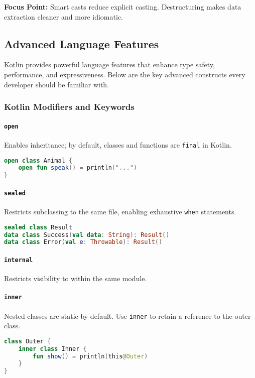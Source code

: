 \documentclass[a4paper,12pt]{article}
\begin{document}
\textbf{Focus Point:} Smart casts reduce explicit casting. Destructuring makes data extraction cleaner and more idiomatic.


\subsection{Advanced Language Features}

Kotlin provides powerful language features that enhance type safety, performance, and expressiveness. Below are the key advanced constructs every developer should be familiar with.

\subsubsection{Kotlin Modifiers and Keywords}

\paragraph{\texttt{open}} Enables inheritance; by default, classes and functions are \texttt{final} in Kotlin.
\begin{lstlisting}[language=Kotlin]
open class Animal {
    open fun speak() = println("...")
}
\end{lstlisting}

\paragraph{\texttt{sealed}} Restricts subclassing to the same file, enabling exhaustive \texttt{when} statements.
\begin{lstlisting}[language=Kotlin]
sealed class Result
data class Success(val data: String): Result()
data class Error(val e: Throwable): Result()
\end{lstlisting}

\paragraph{\texttt{internal}} Restricts visibility to within the same module.

\paragraph{\texttt{inner}} Nested classes are static by default. Use \texttt{inner} to retain a reference to the outer class.
\begin{lstlisting}[language=Kotlin]
class Outer {
    inner class Inner {
        fun show() = println(this@Outer)
    }
}
\end{lstlisting}
\end{document}
